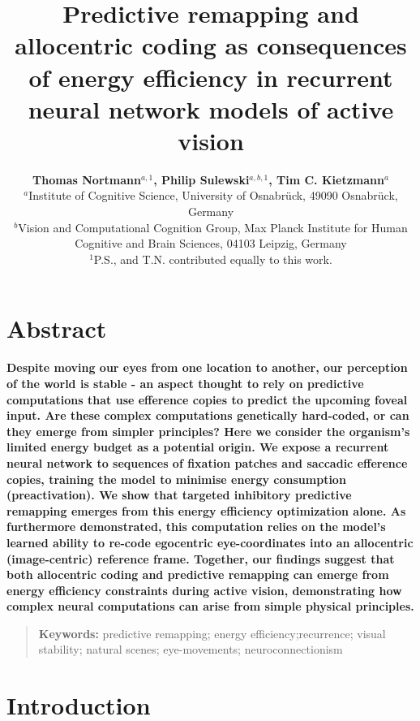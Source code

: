 \documentclass[10pt,letterpaper]{article}
\title{Predictive remapping and allocentric coding as consequences of energy efficiency in recurrent neural network models of active vision}
\author{{\large \bf Thomas Nortmann$^{a,1}$, Philip Sulewski$^{a,b,1}$, Tim C. Kietzmann$^{a}$} \\
$^{a}$Institute of Cognitive Science, University of Osnabrück, 49090 Osnabrück, Germany \\
$^{b}$Vision and Computational Cognition Group, Max Planck Institute for Human Cognitive and Brain Sciences, 04103 Leipzig, Germany \\
$^{1}$P.S., and T.N. contributed equally to this work.}
\begin{document}

\maketitle


\section{Abstract}
{
\bf
Despite moving our eyes from one location to another, our perception of the world is stable - an aspect thought to rely on predictive computations that use efference copies to predict the upcoming foveal input. Are these complex computations genetically hard-coded, or can they emerge from simpler principles? Here we consider the organism's limited energy budget as a potential origin. We expose a recurrent neural network to sequences of fixation patches and saccadic efference copies, training the model to minimise energy consumption (preactivation). We show that targeted inhibitory predictive remapping emerges from this energy efficiency optimization alone. As furthermore demonstrated, this computation relies on the model’s learned ability to re-code egocentric eye-coordinates into an allocentric (image-centric) reference frame. Together, our findings suggest that both allocentric coding and predictive remapping can emerge from energy efficiency constraints during active vision, demonstrating how complex neural computations can arise from simple physical principles.}
\begin{quote}
\small
\textbf{Keywords:} 
predictive remapping; energy efficiency;\newline recurrence; visual stability; natural scenes; eye-movements; neuroconnectionism
\end{quote}

\section{Introduction}
\end{document}
